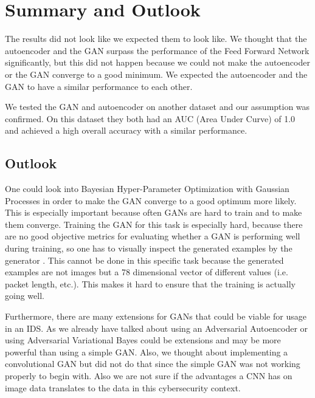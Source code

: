 \documentclass[]{article}
\begin{document}
	\section{Summary and Outlook}
	The results did not look like we expected them to look like. We thought that the autoencoder and the GAN surpass the performance of the Feed Forward Network significantly, but this did not happen because we could not make the autoencoder or the GAN converge to a good minimum. We expected the autoencoder and the GAN to have a similar performance to each other. 
	
	We tested the GAN and autoencoder on another dataset and our assumption was confirmed. On this dataset they both had an AUC (Area Under Curve) of 1.0 and achieved a high overall accuracy with a similar performance. 
	
	\subsection{Outlook}
	\noindent
	One could look into Bayesian Hyper-Parameter Optimization with Gaussian Processes in order to make the GAN converge to a good optimum more likely. This is especially important because often GANs are hard to train and to make them converge. Training the GAN for this task is especially hard, because there are no good objective metrics for evaluating whether a GAN is performing well during training, so one has to visually inspect the generated examples by the generator \cite{https://doi.org/10.48550/arxiv.1606.03498}. This cannot be done in this specific task because the generated examples are not images but a 78 dimensional vector of different values (i.e. packet length, etc.). This makes it hard to ensure that the training is actually going well. 
	\newline
	
	\noindent
	Furthermore, there are many extensions for GANs that could be viable for usage in an IDS. As we already have talked about using an Adversarial Autoencoder or using Adversarial Variational Bayes could be extensions and may be more powerful than using a simple GAN. Also, we thought about implementing a convolutional GAN but did not do that since the simple GAN was not working properly to begin with. Also we are not sure if the advantages a CNN has on image data translates to the data in this cybersecurity context. 
	\newpage
	
	
\end{document}
